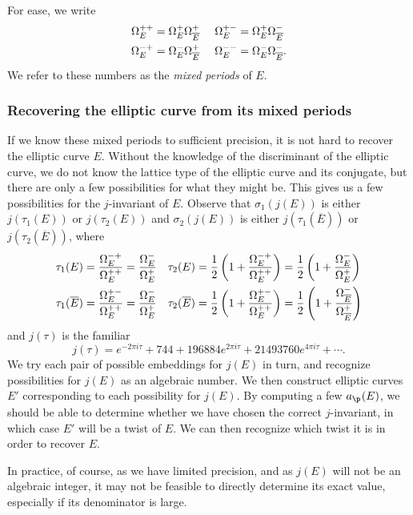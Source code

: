 \documentclass{amsart}
\newcommand{\ap}[1]{a_{\p_{#1}}}
\newcommand{\Ebar}{\overline{E}}
\begin{document}
For ease, we write
\begin{align*}
\Omegapp_E &= \Omegap_E\Omegap_{\Ebar}& \ \Omegapm_E &= \Omegap_E\Omegam_{\Ebar} \\
\Omegamp_E &= \Omegam_E\Omegap_{\Ebar}& \ \Omegamm_E &= \Omegam_E\Omegam_{\Ebar}.
\end{align*}
We refer to these numbers as the {\em mixed periods} of $E$.

\subsubsection{Recovering the elliptic curve from its mixed periods}
If we know these mixed periods to sufficient precision, it is not hard
to recover the elliptic curve $E$. Without the knowledge of the discriminant
of the elliptic curve, we do not know the lattice type of the elliptic curve and its
conjugate, but there are only a few possibilities for what they might
be. This gives us a few possibilities for the $j$-invariant of
$E$. Observe that $\sigma_1(j(E))$ is either $j(\tau_1(E))$ or $j(\tau_2(E))$
and $\sigma_2(j(E))$ is either $j(\tau_1(\Ebar))$ or $j(\tau_2(\Ebar))$,
where
\begin{align*}
    \tau_1(E) &= \frac{\Omegamp_E}{\Omegapp_E} = \frac{\Omegam_E}{\Omegap_E}&  \tau_2(E) &= \frac{1}{2}\left(1 + \frac{\Omegamp_E}{\Omegapp_E}\right) = \frac{1}{2}\left(1 + \frac{\Omegam_E}{\Omegap_E}\right) \\
    \tau_1(\Ebar) &= \frac{\Omegapm_E}{\Omegapp_E} = \frac{\Omegam_E}{\Omegap_E} &    \tau_2(\Ebar) &= \frac{1}{2}\left(1 + \frac{\Omegapm_E}{\Omegapp_E}\right) = \frac{1}{2}\left(1 + \frac{\Omegam_{\Ebar}}{\Omegap_{\Ebar}}\right)
\end{align*}
and $j(\tau)$ is the familiar
\[
    j(\tau) = e^{-2\pi i \tau} + 744 + 196884e^{2\pi i \tau} + 21493760e^{4\pi i \tau} + \cdots.
\]
We try each pair of possible embeddings for $j(E)$ in turn, and recognize
possibilities for $j(E)$ as an algebraic number. We then construct elliptic curves $E'$
corresponding to each possibility for $j(E)$. By computing a few $\ap{}(E)$, we
should be able to determine whether we have chosen the correct $j$-invariant,
in which case $E'$ will be a twist of $E$. We can then recognize which twist it is
in order to recover $E$.

In practice, of course, as we have limited precision, and as $j(E)$ will not be
an algebraic integer, it may not be feasible to directly determine its exact value,
especially if its denominator is large.
\end{document}
